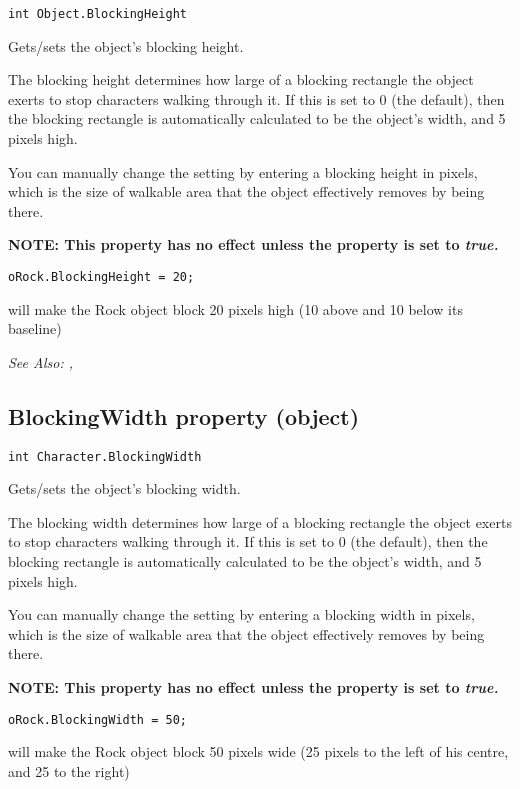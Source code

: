 \begin{verbatim}
int Object.BlockingHeight
\end{verbatim}
Gets/sets the object's blocking height.

The blocking height determines how large of a blocking rectangle the object exerts to
stop characters walking through it. If this is set to 0 (the default), then the
blocking rectangle is automatically calculated to be the object's width, and 5 pixels
high.

You can manually change the setting by entering a blocking height in pixels, which is the
size of walkable area that the object effectively removes by being there.

\bf{NOTE:} This property has no effect unless the  property
is set to \it{true}.

\begin{verbatim}
oRock.BlockingHeight = 20;
\end{verbatim}
will make the Rock object block 20 pixels high (10 above and 10 below its baseline)

\it{See Also:} ,


\subsection{BlockingWidth property (object)}\label{Object.BlockingWidth}%

\begin{verbatim}
int Character.BlockingWidth
\end{verbatim}
Gets/sets the object's blocking width.

The blocking width determines how large of a blocking rectangle the object exerts to
stop characters walking through it. If this is set to 0 (the default), then the
blocking rectangle is automatically calculated to be the object's width, and 5 pixels
high.

You can manually change the setting by entering a blocking width in pixels, which is the
size of walkable area that the object effectively removes by being there.

\bf{NOTE:} This property has no effect unless the  property
is set to \it{true}.

\begin{verbatim}
oRock.BlockingWidth = 50;
\end{verbatim}
will make the Rock object block 50 pixels wide (25 pixels to the left of his centre, and 25 to the right)


